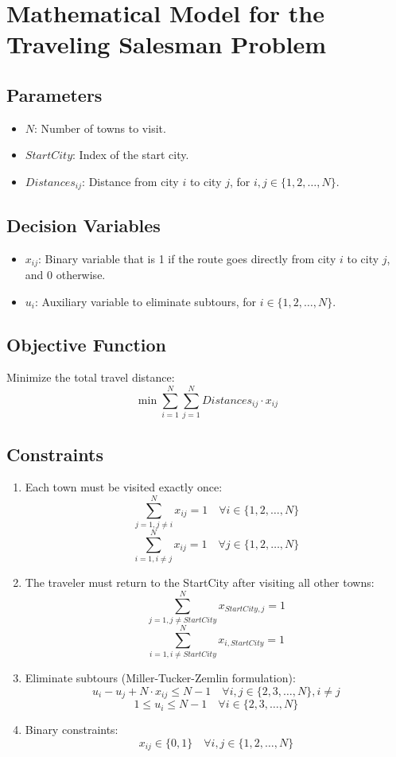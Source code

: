 \documentclass{article}
\begin{document}
\section*{Mathematical Model for the Traveling Salesman Problem}

\subsection*{Parameters}
\begin{itemize}
    \item $N$: Number of towns to visit.
    \item $StartCity$: Index of the start city.
    \item $Distances_{ij}$: Distance from city $i$ to city $j$, for $i, j \in \{1, 2, \ldots, N\}$.
\end{itemize}

\subsection*{Decision Variables}
\begin{itemize}
    \item $x_{ij}$: Binary variable that is 1 if the route goes directly from city $i$ to city $j$, and 0 otherwise.
    \item $u_i$: Auxiliary variable to eliminate subtours, for $i \in \{1, 2, \ldots, N\}$.
\end{itemize}

\subsection*{Objective Function}
Minimize the total travel distance:
\[
\min \sum_{i=1}^{N} \sum_{j=1}^{N} Distances_{ij} \cdot x_{ij}
\]

\subsection*{Constraints}
\begin{enumerate}
    \item Each town must be visited exactly once:
    \[
    \sum_{j=1, j \neq i}^{N} x_{ij} = 1 \quad \forall i \in \{1, 2, \ldots, N\}
    \]
    \[
    \sum_{i=1, i \neq j}^{N} x_{ij} = 1 \quad \forall j \in \{1, 2, \ldots, N\}
    \]

    \item The traveler must return to the StartCity after visiting all other towns:
    \[
    \sum_{j=1, j \neq StartCity}^{N} x_{StartCity, j} = 1
    \]
    \[
    \sum_{i=1, i \neq StartCity}^{N} x_{i, StartCity} = 1
    \]

    \item Eliminate subtours (Miller-Tucker-Zemlin formulation):
    \[
    u_i - u_j + N \cdot x_{ij} \leq N-1 \quad \forall i, j \in \{2, 3, \ldots, N\}, i \neq j
    \]
    \[
    1 \leq u_i \leq N-1 \quad \forall i \in \{2, 3, \ldots, N\}
    \]

    \item Binary constraints:
    \[
    x_{ij} \in \{0, 1\} \quad \forall i, j \in \{1, 2, \ldots, N\}
    \]
\end{enumerate}
\end{document}

